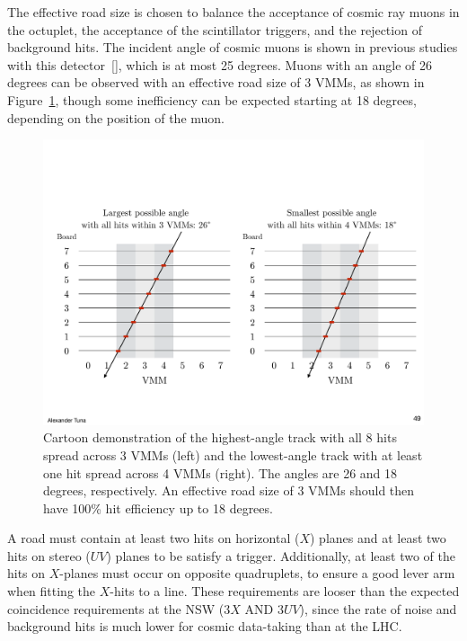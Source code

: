 The effective road size is chosen to balance the acceptance of cosmic ray muons in the octuplet, the acceptance of the scintillator triggers, and the rejection of background hits. The incident angle of cosmic muons is shown in previous studies with this detector~\ref{}, which is at most 25 degrees. Muons with an angle of 26 degrees can be observed with an effective road size of 3 VMMs, as shown in Figure~\ref{fig:cartoon_road_efficiency}, though some inefficiency can be expected starting at 18 degrees, depending on the position of the muon.

\begin{figure}[!htpb]
  \begin{center}
    \includegraphics[width=1.0\textwidth]{figures/cartoons/cartoon_road_efficiency}
  \end{center}
  \vspace{-20pt}
  \caption{Cartoon demonstration of the highest-angle track with all 8 hits spread across 3 VMMs (left) and the lowest-angle track with at least one hit spread across 4 VMMs (right). The angles are 26 and 18 degrees, respectively. An effective road size of 3 VMMs should then have 100\% hit efficiency up to 18 degrees.}
  \label{fig:cartoon_road_efficiency}
\end{figure}

A road must contain at least two hits on horizontal ($X$) planes and at least two hits on stereo ($UV$) planes to be satisfy a trigger. Additionally, at least two of the hits on $X$-planes must occur on opposite quadruplets, to ensure a good lever arm when fitting the $X$-hits to a line. These requirements are looser than the expected coincidence requirements at the NSW ($3X$ AND $3UV$), since the rate of noise and background hits is much lower for cosmic data-taking than at the LHC.

